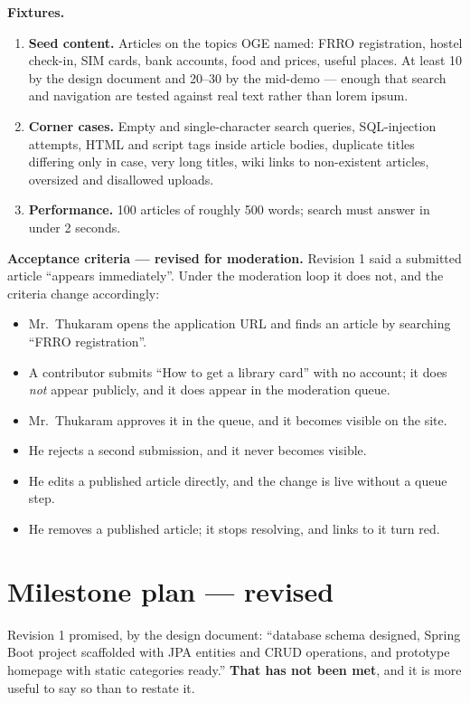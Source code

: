 \documentclass[11pt]{article}
\begin{document}
\textbf{Fixtures.}
\begin{enumerate}
  \item \textbf{Seed content.} Articles on the topics OGE named: FRRO registration, hostel check-in,
        SIM cards, bank accounts, food and prices, useful places. At least 10 by the design document
        and 20--30 by the mid-demo --- enough that search and navigation are tested against real
        text rather than lorem ipsum.
  \item \textbf{Corner cases.} Empty and single-character search queries, SQL-injection attempts,
        HTML and script tags inside article bodies, duplicate titles differing only in case, very
        long titles, wiki links to non-existent articles, oversized and disallowed uploads.
  \item \textbf{Performance.} 100 articles of roughly 500 words; search must answer in under 2
        seconds.
\end{enumerate}

\textbf{Acceptance criteria --- revised for moderation.} Revision 1 said a submitted article
``appears immediately''. Under the moderation loop it does not, and the criteria change accordingly:

\begin{itemize}
  \item Mr.\ Thukaram opens the application URL and finds an article by searching ``FRRO
        registration''.
  \item A contributor submits ``How to get a library card'' with no account; it does \emph{not}
        appear publicly, and it does appear in the moderation queue.
  \item Mr.\ Thukaram approves it in the queue, and it becomes visible on the site.
  \item He rejects a second submission, and it never becomes visible.
  \item He edits a published article directly, and the change is live without a queue step.
  \item He removes a published article; it stops resolving, and links to it turn red.
\end{itemize}

\section{Milestone plan --- revised}

Revision 1 promised, by the design document: ``database schema designed, Spring Boot project
scaffolded with JPA entities and CRUD operations, and prototype homepage with static categories
ready.'' \textbf{That has not been met}, and it is more useful to say so than to restate it.
\end{document}
